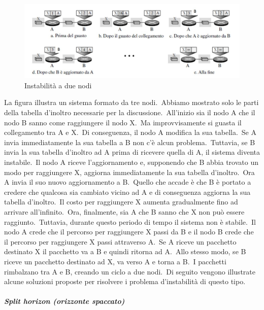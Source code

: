 \begin{figure}[H]
    \centering
    \includegraphics[width=\textwidth]{immagini/Infinity_count.jpg}
    \caption{Instabilità a due nodi}
    \label{Infinity_count}
\end{figure}
La figura illustra un sistema formato da tre nodi.\
Abbiamo mostrato solo le parti della tabella d'inoltro necessarie per la discussione.\
All'inizio sia il nodo A che il nodo B sanno come raggiungere il nodo X.\
Ma improvvisamente si guasta il collegamento tra A e X.\
Di conseguenza, il nodo A modifica la sua tabella.\
Se A invia immediatamente la sua tabella a B non c'è alcun problema.\
Tuttavia, se B invia la sua tabella d'inoltro ad A prima di ricevere quella di A, il sistema diventa instabile.\
Il nodo A riceve l'aggiornamento e, supponendo che B abbia trovato un modo per raggiungere X, aggiorna immediatamente la sua tabella d'inoltro.\
Ora A invia il suo nuovo aggiornamento a B.\
Quello che accade è che B è portato a credere che qualcosa sia cambiato vicino ad A e di conseguenza aggiorna la sua tabella d'inoltro.\
Il costo per raggiungere X aumenta gradualmente fino ad arrivare all'infinito.\
Ora, finalmente, sia A che B sanno che X non può essere raggiunto.\
Tuttavia, durante questo periodo di tempo il sistema non è stabile.\
Il nodo A crede che il percorso per raggiungere X passi da B e il nodo B crede che il percorso per raggiungere X passi attraverso A.\
Se A riceve un pacchetto destinato X il pacchetto va a B e quindi ritorna ad A.\
Allo stesso modo, se B riceve un pacchetto destinato ad X, va verso A e torna a B.\
I pacchetti rimbalzano tra A e B, creando un ciclo a due nodi.\
Di seguito vengono illustrate alcune soluzioni proposte per risolvere i problema d'instabilità di questo tipo.

\paragraph{\emph{Split horizon (orizzonte spaccato)}}

